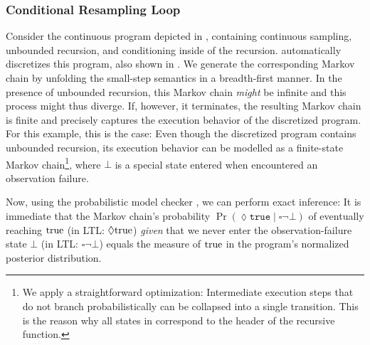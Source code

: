\subsubsection{Conditional Resampling Loop}
Consider the continuous program depicted in , containing continuous sampling, unbounded recursion, and conditioning inside of the recursion. \Slice automatically discretizes this program, also shown in . We generate the corresponding Markov chain by unfolding the small-step semantics in a breadth-first manner. In the presence of unbounded recursion, this Markov chain \emph{might} be infinite and this process might thus diverge. If, however, it terminates, the resulting Markov chain is finite and precisely captures the execution behavior of the discretized program. For this example, this is the case: Even though the discretized program contains unbounded recursion, its execution behavior can be modelled as a finite-state Markov chain\footnote{We apply a straightforward optimization: Intermediate execution steps that do not branch probabilistically can be collapsed into a single transition. This is the reason why all states in  correspond to the header of the recursive function.}, where $\bot$ is a special state entered when encountered an observation failure.

Now, using the probabilistic model checker \Storm, we can perform exact inference: It is immediate that the Markov chain's probability $\Pr(\lozenge \texttt{true} \mid 
\square \lnot \bot)$  of eventually reaching $\textnormal{true}$ (in LTL: $\lozenge\textnormal{true}$)  \emph{given} that we never enter the observation-failure state $\bot$ (in LTL: $\square \lnot \bot$) equals the measure of $\textnormal{true}$ in the program's normalized posterior distribution. 

%

